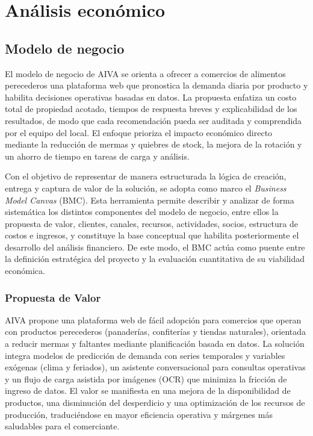 \chapter{Análisis económico}\label{chapter04}

\section{Modelo de negocio}

El modelo de negocio de AIVA se orienta a ofrecer a comercios de alimentos perecederos una plataforma web que pronostica la demanda diaria por producto y habilita decisiones operativas basadas en datos. La propuesta enfatiza un costo total de propiedad acotado, tiempos de respuesta breves y explicabilidad de los resultados, de modo que cada recomendación pueda ser auditada y comprendida por el equipo del local. El enfoque prioriza el impacto económico directo mediante la reducción de mermas y quiebres de stock, la mejora de la rotación y un ahorro de tiempo en tareas de carga y análisis.

Con el objetivo de representar de manera estructurada la lógica de creación, entrega y captura de valor de la solución, se adopta como marco el \textit{Business Model Canvas} (BMC). Esta herramienta permite describir y analizar de forma sistemática los distintos componentes del modelo de negocio, entre ellos la propuesta de valor, clientes, canales, recursos, actividades, socios, estructura de costos e ingresos, y constituye la base conceptual que habilita posteriormente el desarrollo del análisis financiero. De este modo, el BMC actúa como puente entre la definición estratégica del proyecto y la evaluación cuantitativa de su viabilidad económica.

\subsection{Propuesta de Valor}
AIVA propone una plataforma web de fácil adopción para comercios que operan con productos perecederos (panaderías, confiterías y tiendas naturales), orientada a reducir mermas y faltantes mediante planificación basada en datos. La solución integra modelos de predicción de demanda con series temporales y variables exógenas (clima y feriados), un asistente conversacional para consultas operativas y un flujo de carga asistida por imágenes (OCR) que minimiza la fricción de ingreso de datos. El valor se manifiesta en una mejora de la disponibilidad de productos, una disminución del desperdicio y una optimización de los recursos de producción, traduciéndose en mayor eficiencia operativa y márgenes más saludables para el comerciante.

